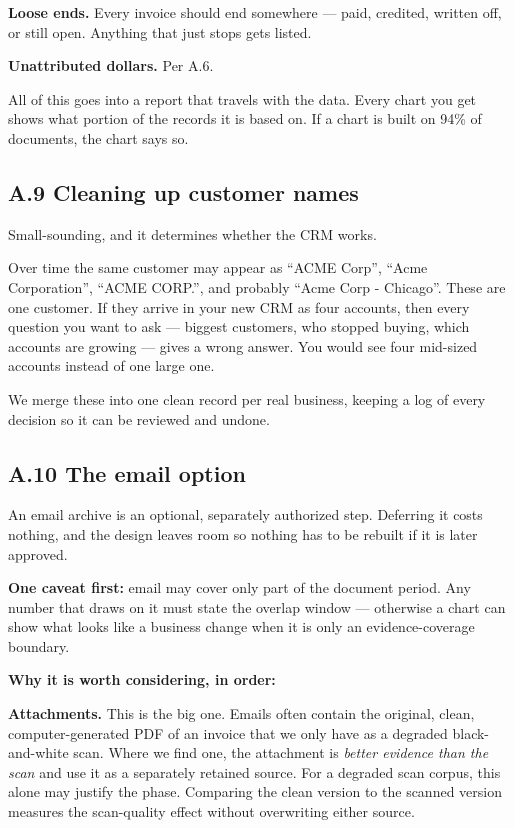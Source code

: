 \documentclass[
]{article}
\begin{document}
\textbf{Loose ends.} Every invoice should end somewhere --- paid,
credited, written off, or still open. Anything that just stops gets
listed.

\textbf{Unattributed dollars.} Per A.6.

All of this goes into a report that travels with the data. Every chart
you get shows what portion of the records it is based on. If a chart is
built on 94\% of documents, the chart says so.

\subsection{A.9 Cleaning up customer
names}\label{a.9-cleaning-up-customer-names}

Small-sounding, and it determines whether the CRM works.

Over time the same customer may appear as ``ACME Corp'', ``Acme
Corporation'', ``ACME CORP.'', and probably ``Acme Corp - Chicago''.
These are one customer. If they arrive in your new CRM as four accounts,
then every question you want to ask --- biggest customers, who stopped
buying, which accounts are growing --- gives a wrong answer. You would
see four mid-sized accounts instead of one large one.

We merge these into one clean record per real business, keeping a log of
every decision so it can be reviewed and undone.

\subsection{A.10 The email option}\label{a.10-the-email-option}

An email archive is an optional, separately authorized step. Deferring
it costs nothing, and the design leaves room so nothing has to be
rebuilt if it is later approved.

\textbf{One caveat first:} email may cover only part of the document
period. Any number that draws on it must state the overlap window ---
otherwise a chart can show what looks like a business change when it is
only an evidence-coverage boundary.

\textbf{Why it is worth considering, in order:}

\textbf{Attachments.} This is the big one. Emails often contain the
original, clean, computer-generated PDF of an invoice that we only have
as a degraded black-and-white scan. Where we find one, the attachment is
\emph{better evidence than the scan} and use it as a separately retained
source. For a degraded scan corpus, this alone may justify the phase.
Comparing the clean version to the scanned version measures the
scan-quality effect without overwriting either source.
\end{document}
